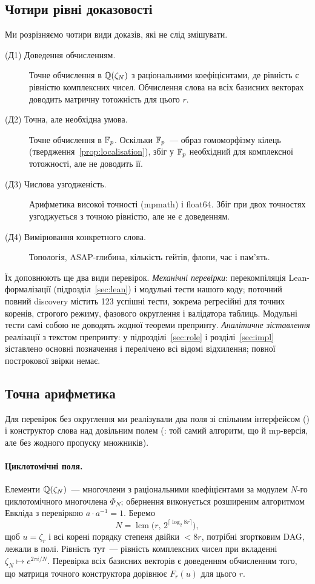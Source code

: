 \documentclass[11pt]{article}
\theoremstyle{plain}
\DeclareMathOperator{\lcm}{lcm}
\begin{document}
\subsection{Чотири рівні доказовості}\label{sec:evidence}
Ми розрізняємо чотири види доказів, які не слід змішувати.
\begin{description}
\item[(Д1) Доведення обчисленням.] Точне обчислення в $\mathbb{Q}(\zeta_N)$ з раціональними коефіцієнтами, де рівність є рівністю комплексних чисел. Обчислення слова на всіх базисних векторах доводить матричну тотожність для цього $r$.
\item[(Д2) Точна, але необхідна умова.] Точне обчислення в $\mathbb{F}_p$. Оскільки $\mathbb{F}_p$~--- образ гомоморфізму кілець (твердження~\ref{prop:localisation}), збіг у $\mathbb{F}_p$ необхідний для комплексної тотожності, але не доводить її.
\item[(Д3) Числова узгодженість.] Арифметика високої точності (mpmath) і float64. Збіг при двох точностях узгоджується з точною рівністю, але не є доведенням.
\item[(Д4) Вимірювання конкретного слова.] Топологія, ASAP-глибина, кількість гейтів, флопи, час і пам'ять.
\end{description}
Їх доповнюють ще два види перевірок. \emph{Механічні перевірки}: перекомпіляція Lean-формалізації (підрозділ~\ref{sec:lean}) і модульні тести нашого коду; поточний повний discovery містить 123 успішні тести, зокрема регресійні для точних коренів, строгого режиму, фазового округлення і валідатора таблиць. Модульні тести самі собою не доводять жодної теореми препринту. \emph{Аналітичне зіставлення} реалізації з текстом препринту: у підрозділі~\ref{sec:role} і розділі~\ref{sec:impl} зіставлено основні позначення і перелічено всі відомі відхилення; повної построкової звірки немає.

\subsection{Точна арифметика}\label{sec:exact}
Для перевірок без округлення ми реалізували два поля зі спільним інтерфейсом () і конструктор слова над довільним полем (: той самий алгоритм, що й mp-версія, але без жодного пропуску множників).

\paragraph{Циклотомічні поля.}
Елементи $\mathbb{Q}(\zeta_N)$~--- многочлени з раціональними коефіцієнтами за модулем $N$-го циклотомічного многочлена $\Phi_N$; обернення виконується розширеним алгоритмом Евкліда з перевіркою $a\cdot a^{-1}=1$. Беремо
\begin{equation}\label{eq:N}
N=\lcm\bigl(r,\,2^{\lceil\log_2 8r\rceil}\bigr),
\end{equation}
щоб $u=\zeta_r$ і всі корені порядку степеня двійки $<8r$, потрібні згортковим DAG, лежали в полі. Рівність тут~--- рівність комплексних чисел при вкладенні $\zeta_N\mapsto e^{2\pi i/N}$. Перевірка всіх базисних векторів є доведенням обчисленням того, що матриця точного конструктора  дорівнює $F_r(u)$ для цього $r$.
\end{document}
